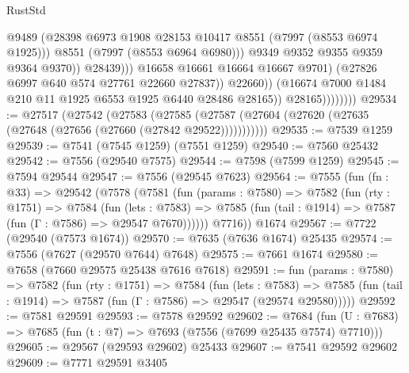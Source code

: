 \begin{lexlean}{RustStd}
\begin{coremodule}
                                          @9489
                                          (@28398
                                            @6973
                                            @1908
                                            @28153
                                            @10417
                                            @8551
                                            (@7997 (@8553 @6974 @1925)))
                                          @8551
                                          (@7997 (@8553 @6964 @6980)))
                                        @9349
                                        @9352
                                        @9355
                                        @9359
                                        @9364
                                        @9370))
                                    @28439)))
                              @16658
                              @16661
                              @16664
                              @16667
                              @9701)
                            (@27826 @6997 @640 @574 @27761 @22660 @27837))
                          @22660))
                      (@16674 @7000 @1484 @210 @11 @1925 @6553 @1925 @6440 @28486 @28165))
                    @28165))))))))
@29534 := @27517
    (@27542
      (@27583
        (@27585 (@27587 (@27604 (@27620 (@27635 (@27648 (@27656 (@27660 (@27842 @29522)))))))))))
@29535 := @7539 @1259
@29539 := @7541 (@7545 @1259) (@7551 @1259)
@29540 := @7560 @25432
@29542 := @7556 (@29540 @7575)
@29544 := @7598 (@7599 @1259)
@29545 := @7594 @29544
@29547 := @7556 (@29545 @7623)
@29564 := @7555
    (fun (fn : @33) =>
    @29542
      (@7578
        (@7581
          (fun (params : @7580) =>
          @7582
            (fun (rty : @1751) =>
            @7584
              (fun (lets : @7583) =>
              @7585 (fun (tail : @1914) => @7587 (fun (Γ : @7586) => @29547 @7670))))))
        @7716))
    @1674
@29567 := @7722 (@29540 (@7573 @1674))
@29570 := @7635 (@7636 @1674) @25435
@29574 := @7556 (@7627 (@29570 @7644) @7648)
@29575 := @7661 @1674
@29580 := @7658 (@7660 @29575 @25438 @7616 @7618)
@29591 := fun (params : @7580) =>
  @7582
    (fun (rty : @1751) =>
    @7584
      (fun (lets : @7583) =>
      @7585 (fun (tail : @1914) => @7587 (fun (Γ : @7586) => @29547 (@29574 @29580)))))
@29592 := @7581 @29591
@29593 := @7578 @29592
@29602 := @7684
    (fun (U : @7683) => @7685 (fun (t : @7) => @7693 (@7556 (@7699 @25435 @7574) @7710)))
@29605 := @29567 (@29593 @29602) @25433
@29607 := @7541 @29592 @29602
@29609 := @7771 @29591 @3405

\end{coremodule}
\end{lexlean}
